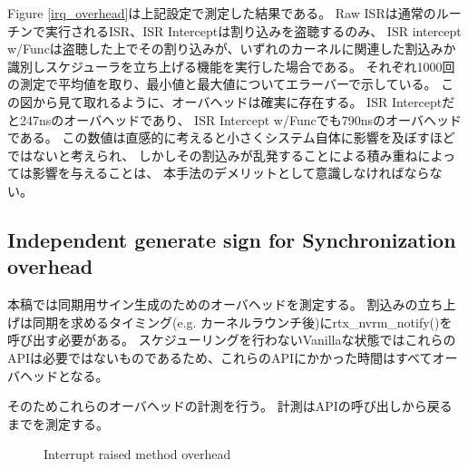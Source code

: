 Figure \ref{irq_overhead}は上記設定で測定した結果である。
Raw ISRは通常のルーチンで実行されるISR、ISR Interceptは割り込みを盗聴するのみ、
ISR intercept w/Funcは盗聴した上でその割り込みが、いずれのカーネルに関連した割込みか識別しスケジューラを立ち上げる機能を実行した場合である。
それぞれ1000回の測定で平均値を取り、最小値と最大値についてエラーバーで示している。
この図から見て取れるように、オーバヘッドは確実に存在する。
ISR Interceptだと247nsのオーバヘッドであり、
ISR Intercept w/Funcでも790nsのオーバヘッドである。
この数値は直感的に考えると小さくシステム自体に影響を及ぼすほどではないと考えられ、
しかしその割込みが乱発することによる積み重ねによっては影響を与えることは、
本手法のデメリットとして意識しなければならない。


\subsection{Independent generate sign for Synchronization overhead}
本稿では同期用サイン生成のためのオーバヘッドを測定する。
割込みの立ち上げは同期を求めるタイミング(e.g. カーネルラウンチ後)にrtx\_nvrm\_notify()を呼び出す必要がある。
スケジューリングを行わないVanillaな状態ではこれらのAPIは必要ではないものであるため、これらのAPIにかかった時間はすべてオーバヘッドとなる。

そのためこれらのオーバヘッドの計測を行う。
計測はAPIの呼び出しから戻るまでを測定する。

\begin{figure}[!t]
\begin{center}
\caption{Interrupt raised method overhead}
\label{fig:irq_rise_overhead}
\end{center}
\end{figure}

